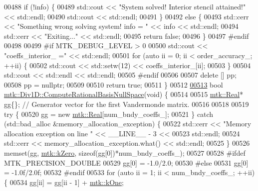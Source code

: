 \begin{DoxyCode}
{{00488   \textcolor{keywordflow}{if} (!info) \{
00489     std::cout << \textcolor{stringliteral}{"System solved! Interior stencil attained!"} << std::endl;
00490     std::cout << std::endl;
00491   \}
00492   \textcolor{keywordflow}{else} \{
00493     std::cerr << \textcolor{stringliteral}{"Something wrong solving system! info = "} << info << std::endl;
00494     std::cerr << \textcolor{stringliteral}{"Exiting..."} << std::endl;
00495     \textcolor{keywordflow}{return} \textcolor{keyword}{false};
00496   \}
00497 \textcolor{preprocessor}{  #endif}
00498 
00499 \textcolor{preprocessor}{  #if MTK\_DEBUG\_LEVEL > 0}
00500   std::cout << \textcolor{stringliteral}{"coeffs\_interior\_ ="} << std::endl;
00501   \textcolor{keywordflow}{for} (\textcolor{keyword}{auto} ii = 0; ii < order\_accuracy\_; ++ii) \{
00502     std::cout << std::setw(12) << coeffs\_interior\_[ii];
00503   \}
00504   std::cout << std::endl << std::endl;
00505 \textcolor{preprocessor}{  #endif}
00506 
00507   \textcolor{keyword}{delete} [] pp;
00508   pp = \textcolor{keyword}{nullptr};
00509 
00510   \textcolor{keywordflow}{return} \textcolor{keyword}{true};
00511 \}
00512 
\hypertarget{mtk__div__1d_8cc_source_l00513}{}\hyperlink{classmtk_1_1Div1D_aa0c0c278b2c00a29c1ceaa70d31aebab}{00513} \textcolor{keywordtype}{bool} \hyperlink{classmtk_1_1Div1D_aa0c0c278b2c00a29c1ceaa70d31aebab}{mtk::Div1D::ComputeRationalBasisNullSpace}(\textcolor{keywordtype}{void}) \{
00514 
00515   \hyperlink{group__c01-roots_gac080bbbf5cbb5502c9f00405f894857d}{mtk::Real}* gg\{\}; \textcolor{comment}{// Generator vector for the first Vandermonde matrix.}
00516 
00518 
00519   \textcolor{keywordflow}{try} \{
00520     gg = \textcolor{keyword}{new} \hyperlink{group__c01-roots_gac080bbbf5cbb5502c9f00405f894857d}{mtk::Real}[num\_bndy\_coeffs\_];
00521   \} \textcolor{keywordflow}{catch} (std::bad\_alloc &memory\_allocation\_exception) \{
00522     std::cerr << \textcolor{stringliteral}{"Memory allocation exception on line "} << \_\_LINE\_\_ - 3 <<
00523       std::endl;
00524     std::cerr << memory\_allocation\_exception.what() << std::endl;
00525   \}
00526   memset(gg, \hyperlink{group__c01-roots_ga59a451a5fae30d59649bcda274fea271}{mtk::kZero}, \textcolor{keyword}{sizeof}(gg[0])*num\_bndy\_coeffs\_);
00527 
00528 \textcolor{preprocessor}{  #ifdef MTK\_PRECISION\_DOUBLE}
00529   gg[0] = -1.0/2.0;
00530 \textcolor{preprocessor}{  #else}
00531   gg[0] = -1.0f/2.0f;
00532 \textcolor{preprocessor}{  #endif}
00533   \textcolor{keywordflow}{for} (\textcolor{keyword}{auto} ii = 1; ii < num\_bndy\_coeffs\_; ++ii) \{
00534     gg[ii] = gg[ii - 1] + \hyperlink{group__c01-roots_ga26407c24d43b6b95480943340d285c71}{mtk::kOne};
}}
\end{DoxyCode}
